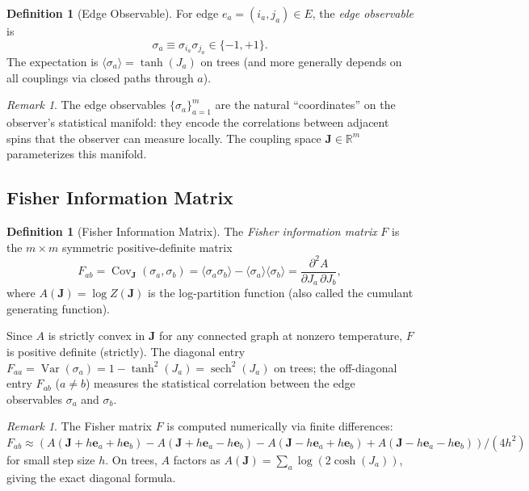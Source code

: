 \documentclass[11pt]{article}
\theoremstyle{definition}
\newtheorem{definition}[theorem]{Definition}
\theoremstyle{remark}
\newtheorem{remark}[theorem]{Remark}
\newcommand{\Fish}{F}
\newcommand{\coupl}{\mathbf{J}}
\newcommand{\partf}{Z}
\newcommand{\Cov}{\operatorname{Cov}}
\newcommand{\Var}{\operatorname{Var}}
\newcommand{\sech}{\operatorname{sech}}
\newcommand{\edgeo}{\sigma}
\begin{document}
\begin{definition}[Edge Observable]
\label{def:edge-observable}
For edge $e_a = (i_a, j_a) \in E$, the \emph{edge observable} is
\begin{equation}
  \edgeo_a \equiv \sigma_{i_a} \sigma_{j_a} \in \{-1, +1\}.
  \label{eq:edge-observable}
\end{equation}
The expectation is $\langle \edgeo_a \rangle = \tanh(J_a)$ on trees
(and more generally depends on all couplings via closed paths through $a$).
\end{definition}

\begin{remark}
The edge observables $\{\edgeo_a\}_{a=1}^m$ are the natural ``coordinates''
on the observer's statistical manifold: they encode the correlations
between adjacent spins that the observer can measure locally. The coupling
space $\coupl \in \mathbb{R}^m$ parameterizes this manifold.
\end{remark}

\subsection{Fisher Information Matrix}

\begin{definition}[Fisher Information Matrix]
\label{def:fisher}
The \emph{Fisher information matrix} $\Fish$ is the $m \times m$ symmetric
positive-definite matrix
\begin{equation}
  \Fish_{ab} = \Cov_{\coupl}(\edgeo_a, \edgeo_b)
    = \langle \edgeo_a \edgeo_b \rangle - \langle \edgeo_a \rangle
      \langle \edgeo_b \rangle
    = \frac{\partial^2 A}{\partial J_a \, \partial J_b},
  \label{eq:fisher-def}
\end{equation}
where $A(\coupl) = \log \partf(\coupl)$ is the log-partition function
(also called the cumulant generating function).
\end{definition}

Since $A$ is strictly convex in $\coupl$ for any connected graph at
nonzero temperature, $\Fish$ is positive definite (strictly). The
diagonal entry $\Fish_{aa} = \Var(\edgeo_a) = 1 - \tanh^2(J_a) = \sech^2(J_a)$
on trees; the off-diagonal entry $\Fish_{ab}$ ($a \neq b$) measures the
statistical correlation between the edge observables $\edgeo_a$ and $\edgeo_b$.

\begin{remark}
The Fisher matrix $\Fish$ is computed numerically via finite differences:
$\Fish_{ab} \approx (A(\coupl + h\mathbf{e}_a + h\mathbf{e}_b)
- A(\coupl + h\mathbf{e}_a - h\mathbf{e}_b)
- A(\coupl - h\mathbf{e}_a + h\mathbf{e}_b)
+ A(\coupl - h\mathbf{e}_a - h\mathbf{e}_b))/(4h^2)$
for small step size $h$. On trees, $A$ factors as
$A(\coupl) = \sum_a \log(2\cosh(J_a))$, giving the exact diagonal formula.
\end{remark}
\end{document}
